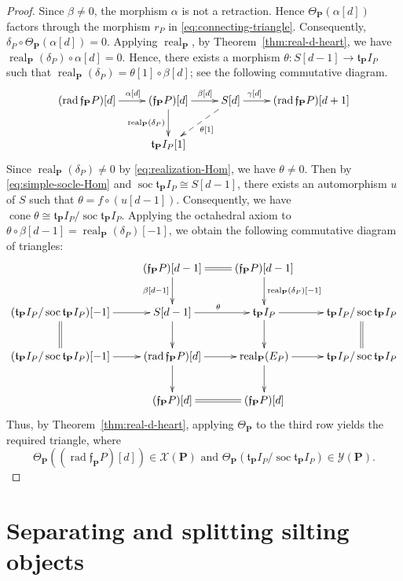 \documentclass[11pt,a4paper,reqno]{amsart}
\theoremstyle{plain}
\numberwithin{equation}{section}
\theoremstyle{definition}
\newcommand{\real}{\operatorname{real}}
\newcommand{\PP}{\mathbf{P}}
\newcommand{\X}{\mathcal{X}}
\newcommand{\Y}{\mathcal{Y}}
\begin{document}
\begin{proof}
Since $\beta\neq 0$, the morphism $\alpha$ is not a retraction. Hence $\Theta_{\PP}(\alpha[d])$ factors through the morphism $r_P$ in \eqref{eq:connecting-triangle}. Consequently, $\delta_P\circ\Theta_{\PP}(\alpha[d])=0$. Applying $\real_{\PP}$, by Theorem~\ref{thm:real-d-heart}, we have $\real_{\PP}(\delta_P)\circ\alpha[d]=0$. Hence, there exists a morphism $\theta\colon S[d-1]\to \mathfrak{t}_{\PP}I_P$ such that $\real_{\PP}(\delta_P)=\theta[1]\circ\beta[d]$; see the following commutative diagram.
\[\xymatrix{
(\operatorname{rad}\mathfrak{f}_{\PP}P)[d]\ar[r]^{\quad\alpha[d]} & (\mathfrak{f}_{\PP}P)[d]\ar[r]^{\quad\beta[d]}\ar[d]_{\real_{\PP}(\delta_P)} & S[d]\ar[r]^{\gamma[d]\qquad\quad}\ar@{-->}[ld]^{\theta[1]} & (\operatorname{rad}\mathfrak{f}_{\PP}P)[d+1]\\
&\mathfrak{t}_{\PP}I_P[1]
}\]
Since $\real_{\PP}(\delta_P)\neq 0$ by \eqref{eq:realization-Hom}, we have $\theta\neq 0$. Then by \eqref{eq:simple-socle-Hom} and $\operatorname{soc}\mathfrak{t}_{\PP}I_P\cong S[d-1]$, there exists an automorphism $u$ of $S$ such that $\theta=f\circ (u[d-1])$. Consequently, we have $\operatorname{cone}\theta \cong \mathfrak{t}_{\PP}I_P/\operatorname{soc}\mathfrak{t}_{\PP}I_P$. Applying the octahedral axiom to $\theta\circ\beta[d-1]=\real_{\PP}(\delta_P)[-1]$, we obtain the following commutative diagram of triangles:
\[\xymatrix{
&(\mathfrak{f}_{\PP}P)[d-1]\ar@{=}[r]\ar[d]_{\beta[d-1]}&(\mathfrak{f}_{\PP}P)[d-1]\ar[d]^{\real_{\PP}(\delta_P)[-1]}\\
(\mathfrak{t}_{\PP}I_P/\operatorname{soc}\mathfrak{t}_{\PP}I_P)[-1]\ar@{=}[d]\ar[r]& S[d-1]\ar[r]^{\theta}\ar[d]&\mathfrak{t}_{\PP}I_P\ar[r]\ar[d]&\mathfrak{t}_{\PP}I_P/\operatorname{soc}\mathfrak{t}_{\PP}I_P\ar@{=}[d]\\
(\mathfrak{t}_{\PP}I_P/\operatorname{soc}\mathfrak{t}_{\PP}I_P)[-1]\ar[r]&(\operatorname{rad}\mathfrak{f}_{\PP}P)[d]\ar[r]\ar[d]&\real_{\PP}(E_P)\ar[r]\ar[d]&\mathfrak{t}_{\PP}I_P/\operatorname{soc}\mathfrak{t}_{\PP}I_P\\
&(\mathfrak{f}_{\PP}P)[d]\ar@{=}[r]&(\mathfrak{f}_{\PP}P)[d]
}\]
Thus, by Theorem~\ref{thm:real-d-heart}, applying $\Theta_{\PP}$ to the third row yields the required triangle, where 
\[\Theta_{\PP}((\operatorname{rad}\mathfrak{f}_{\PP}P)[d])\in\X(\PP)\text{ and }\Theta_{\PP}(\mathfrak{t}_{\PP}I_P/\operatorname{soc}\mathfrak{t}_{\PP}I_P)\in\Y(\PP).\]
\end{proof}

\section{Separating and splitting silting objects}\label{sec:sep-spli}
\end{document}

